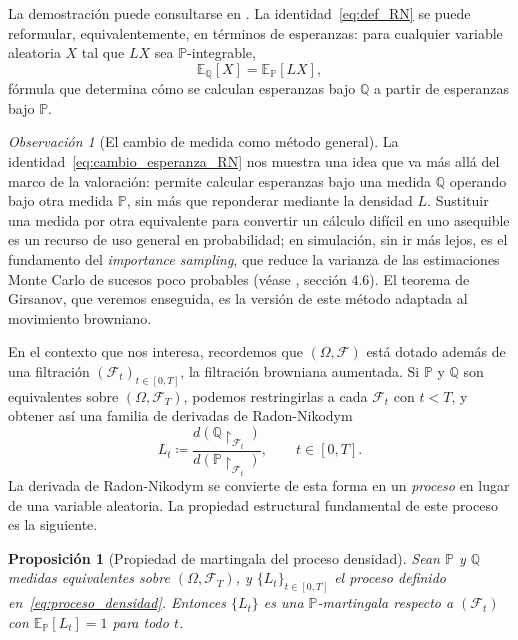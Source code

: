 \documentclass[11pt,a4paper,oneside]{report}
\theoremstyle{plain}
\newtheorem{proposicion}[teorema]{Proposición}
\theoremstyle{definition}
\theoremstyle{remark}
\newtheorem{observacion}[teorema]{Observación}
\newcommand{\E}{\mathbb{E}}
\newcommand{\PP}{\mathbb{P}}
\newcommand{\Q}{\mathbb{Q}}
\newcommand{\F}{\mathcal{F}}
\newcommand{\1}{\mathbf{1}}
\newcommand{\eqdef}{\coloneqq}
\begin{document}
La demostración puede consultarse en \cite{williams}.
La identidad~\eqref{eq:def_RN} se puede reformular, equivalentemente, en
términos de esperanzas: para cualquier variable aleatoria $X$ tal que
$L X$ sea $\PP$-integrable,
\begin{equation}\label{eq:cambio_esperanza_RN}
  \E_\Q[X] = \E_\PP[L X],
\end{equation}
fórmula que determina cómo se calculan esperanzas bajo $\Q$ a partir de
esperanzas bajo $\PP$.

\begin{observacion}[El cambio de medida como método general]
\label{obs:cambio_medida_general}
La identidad~\eqref{eq:cambio_esperanza_RN} nos muestra una idea que va más allá del marco de la valoración: permite calcular esperanzas bajo una
medida $\Q$ operando bajo otra medida $\PP$, sin más que reponderar
mediante la densidad $L$. Sustituir una medida por otra equivalente para
convertir un cálculo difícil en uno asequible es un recurso de uso
general en probabilidad; en simulación, sin ir más lejos, es el
fundamento del \emph{importance sampling}, que reduce la varianza de las
estimaciones Monte Carlo de sucesos poco probables (véase
\cite{glasserman}, sección 4.6). El teorema de
Girsanov, que veremos enseguida, es la versión de este método
adaptada al movimiento browniano.
\end{observacion}

En el
contexto que nos interesa, recordemos que $(\Omega, \F)$ está dotado además de una
filtración $(\F_t)_{t \in [0, T]}$, la filtración browniana aumentada. Si $\PP$
y $\Q$ son equivalentes sobre $(\Omega, \F_T)$, podemos restringirlas
a cada $\F_t$ con $t < T$, y obtener así una familia de derivadas de
Radon-Nikodym
\begin{equation}\label{eq:proceso_densidad}
  L_t \eqdef \frac{d(\Q\!\restriction_{\F_t})}{d(\PP\!\restriction_{\F_t})},
  \qquad t \in [0, T].
\end{equation}
La derivada de Radon-Nikodym se convierte de esta forma en un \emph{proceso} en
lugar de una variable aleatoria. La propiedad estructural fundamental
de este proceso es la siguiente.

\begin{proposicion}[Propiedad de martingala del proceso densidad]
\label{prop:martingala_densidad}
Sean $\PP$ y $\Q$ medidas equivalentes sobre $(\Omega, \F_T)$, y
$\{L_t\}_{t \in [0, T]}$ el proceso definido en~\eqref{eq:proceso_densidad}.
Entonces $\{L_t\}$ es una $\PP$-martingala respecto a $(\F_t)$ con
$\E_\PP[L_t] = 1$ para todo $t$.
\end{proposicion}
\end{document}

